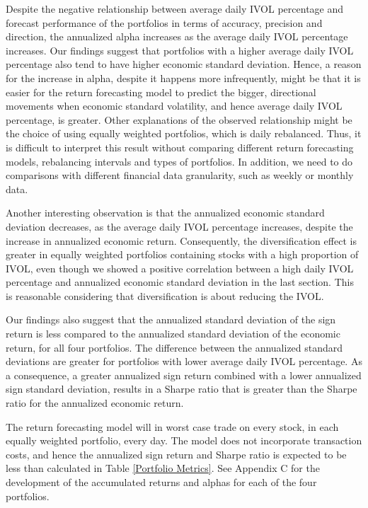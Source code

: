 Despite the negative relationship between average daily IVOL percentage and forecast performance of the portfolios in terms of accuracy, precision and direction, the annualized alpha increases as the average daily IVOL percentage increases. Our findings suggest that portfolios with a higher average daily IVOL percentage also tend to have higher economic standard deviation. Hence, a reason for the increase in alpha, despite it happens more infrequently, might be that it is easier for the return forecasting model to predict the bigger, directional movements when economic standard volatility, and hence average daily IVOL percentage, is greater. Other explanations of the observed relationship might be the choice of using equally weighted portfolios, which is daily rebalanced. Thus, it is difficult to interpret this result without comparing different return forecasting models, rebalancing intervals and types of portfolios. In addition, we need to do comparisons with different financial data granularity, such as weekly or monthly data.

Another interesting observation is that the annualized economic standard deviation decreases, as the average daily IVOL percentage increases, despite the increase in annualized economic return. Consequently, the diversification effect is greater in equally weighted portfolios containing stocks with a high proportion of IVOL, even though we showed a positive correlation between a high daily IVOL percentage and annualized economic standard deviation in the last section. This is reasonable considering that diversification is about reducing the IVOL.

Our findings also suggest that the annualized standard deviation of the sign return is less compared to the annualized standard deviation of the economic return, for all four portfolios. The difference between the annualized standard deviations are greater for portfolios with lower average daily IVOL percentage. As a consequence, a greater annualized sign return combined with a lower annualized sign standard deviation, results in a Sharpe ratio that is greater than the Sharpe ratio for the annualized economic return. 

The return forecasting model will in worst case trade on every stock, in each equally weighted portfolio, every day. The model does not incorporate transaction costs, and hence the annualized sign return and Sharpe ratio is expected to be less than calculated in Table \ref{Portfolio Metrics}. See Appendix C for the development of the accumulated returns and alphas for each of the four portfolios. 

